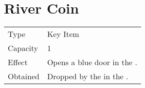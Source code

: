 \section{River Coin}
\label{item:river_coin}


\noindent\begin{tabularx}{\textwidth}[l]{lX}
	Type
	& Key Item
\\
	Capacity
	& 1
\\
	Effect
	& Opens a blue door in the \nameref{map:focus_tower}.
\\
	Obtained
	& Dropped by the \nameref{monster:ice_golem} in the \nameref{ice_pyramid}.
\end{tabularx}
